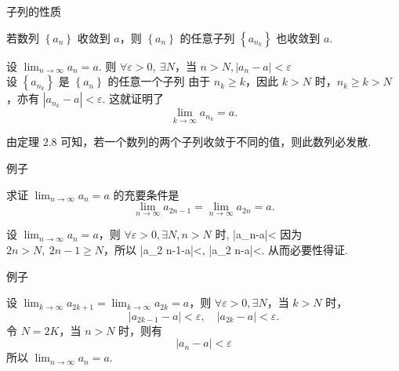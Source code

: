 \documentclass[mathserif]{beamer}
\begin{document}
\begin{frame}{子列的性质}%
	\begin{thm}
		\suojin 若数列 $\left\{a_n\right\}$ 收敛到 $a$，则 $\left\{a_n\right\}$ 的任意子列 $\left\{a_{n_k}\right\}$ 也收敛到 $a$.
		\end{thm}  
	\pause 
	\begin{proofs}
		\suojin 设 $\lim _{n \rightarrow \infty} a_n=a$. 则 $\forall \varepsilon>0,\ \exists N$，当 $n>N,\left|a_n-a\right|<\varepsilon$\jh \\
	\suojin 设 $\left\{a_{n_k}\right\}$ 是 $\left\{a_n\right\}$ 的任意一个子列\jh 
	由于 $n_k \geqslant k$，因此 $k>N$ 时，$n_k \geqslant k>N$，亦有 $\left|a_{n_k}-a\right|<\varepsilon$. 这就证明了
	$$
	\lim _{k \rightarrow \infty} a_{n_k}=a . 
	$$
	\end{proofs}
\pause
	\begin{alertblock}{}
		\suojin {} 由定理 $2. 8$ 可知，若一个数列的两个子列收敛于不同的值，则此数列必发散.
	\end{alertblock}
\end{frame}





\begin{frame}{例子}%
	\begin{ex}
		\suojin 求证 $\lim _{n \rightarrow \infty} a_n=a$ 的充要条件是
			$$
			\lim _{n \rightarrow \infty} a_{2 n-1}=\lim _{n \rightarrow \infty} a_{2 n}=a . 
			$$
	\end{ex}
	\pause 
	\begin{proofs}[必要性]
		\suojin 设 $\lim _{n \rightarrow \infty} a_n=a$，则 $\forall \varepsilon>0, \exists N, n>N$ 时,
	\benas
	\left|a_n-a\right|<\varepsilon
	\eenas
	因为 $2 n>N,\  2 n-1 \geq N$，所以
	\benas
	\left|a_{2 n-1}-a\right|<\varepsilon, \quad\left|a_{2 n}-a\right|<\varepsilon .
	\eenas
	从而必要性得证.
    \end{proofs}
	
\end{frame}




\begin{frame}{例子}%
	\begin{proofs}[充分性]
	\suojin 设 $\lim _{k \rightarrow \infty} a_{2 k+1}=\lim _{k \rightarrow \infty} a_{2 k}=a$，则 $\forall \varepsilon>0, \exists N$，当 $k>N$ 时，    $$
	\left|a_{2 k-1}-a\right|<\varepsilon, \quad\left|a_{2 k}-a\right|<\varepsilon .
	$$
	\suojin 令 $N=2 K$，当 $n>N$ 时，则有
	$$
	\left|a_n-a\right|<\varepsilon
	$$
	所以 $\lim _{n \rightarrow \infty} a_n=a$.
   \end{proofs}
\end{frame}
\end{document}
